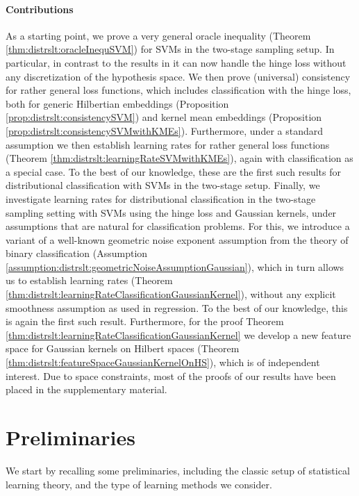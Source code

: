\documentclass[letterpaper]{article} %
\begin{document}
\paragraph{Contributions}
As a starting point, we prove a very general oracle inequality (Theorem \ref{thm:distrslt:oracleInequSVM}) for SVMs in the two-stage sampling setup.
In particular, in contrast to the results in \cite{fiedler2024statistical} it can now handle the hinge loss without any discretization of the hypothesis space.
We then prove (universal) consistency for rather general loss functions, which includes classification with the hinge loss, both for generic Hilbertian embeddings (Proposition \ref{prop:distrslt:consistencySVM}) and kernel mean embeddings (Proposition \ref{prop:distrslt:consistencySVMwithKMEs}).
Furthermore, under a standard assumption we then establish learning rates for rather general loss functions (Theorem \ref{thm:distrslt:learningRateSVMwithKMEs}), again with classification as a special case.
To the best of our knowledge, these are the first such results for distributional classification with SVMs in the two-stage setup.
Finally, we investigate learning rates for distributional classification in the two-stage sampling setting with SVMs using the hinge loss and Gaussian kernels, under assumptions that are natural for classification problems.
For this, we introduce a variant of a well-known geometric noise exponent assumption from the theory of binary classification (Assumption \ref{assumption:distrslt:geometricNoiseAssumptionGaussian}),
which in turn allows us to establish learning rates (Theorem \ref{thm:distrslt:learningRateClassificationGaussianKernel}), %
without any explicit smoothness assumption as used in regression.
To the best of our knowledge, this is again the first such result.
Furthermore, for the proof Theorem \ref{thm:distrslt:learningRateClassificationGaussianKernel} we develop a new feature space for Gaussian kernels on Hilbert spaces (Theorem \ref{thm:distrslt:featureSpaceGaussianKernelOnHS}), which is of independent interest.
Due to space constraints, most of the proofs of our results have been placed in the supplementary material.

\section{Preliminaries} \label{sec:distrslt:prelims}
We start by recalling some preliminaries, including the classic setup of statistical learning theory, and the type of learning methods we consider.
\end{document}
